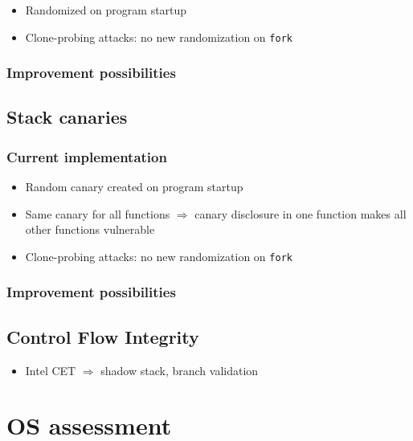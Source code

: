 \begin{itemize}
	\item{Randomized on program startup}
	\item{Clone-probing attacks: no new randomization on \texttt{fork}}
\end{itemize}

\subsection{Improvement possibilities}
\label{subsec:aslr-improvement}

\section{Stack canaries}
\label{sec:stack-canaries}

\subsection{Current implementation}
\label{subsec:canaries-current}

\begin{itemize}
	\item{Random canary created on program startup}
	\item{Same canary for all functions $\Rightarrow$ canary disclosure in one function makes all other functions vulnerable}
	\item{Clone-probing attacks: no new randomization on \texttt{fork}}
\end{itemize}

\subsection{Improvement possibilities}
\label{subsec:canaries-improvement}

\section{Control Flow Integrity}
\label{sec:cfi}

\begin{itemize}
	\item{Intel CET $\Rightarrow$ shadow stack, branch validation}
\end{itemize}

\chapter{OS assessment}
\label{chp:os-assessment}
